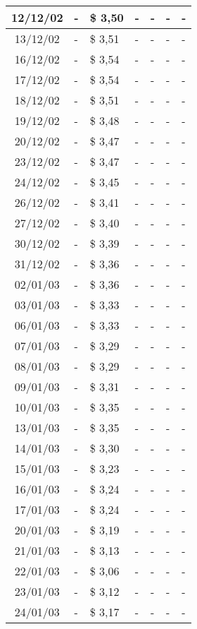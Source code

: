 \begin{center}
\begin{longtable}{|c|p{1.5cm}|p{1.5cm}|p{1.5cm}|p{1.5cm}|p{1.5cm}|p{1.5cm}|}
12/12/02 & - & \$ 3,50 & - & - & - & - \\ \hline
13/12/02 & - & \$ 3,51 & - & - & - & - \\ \hline
16/12/02 & - & \$ 3,54 & - & - & - & - \\ \hline
17/12/02 & - & \$ 3,54 & - & - & - & - \\ \hline
18/12/02 & - & \$ 3,51 & - & - & - & - \\ \hline
19/12/02 & - & \$ 3,48 & - & - & - & - \\ \hline
20/12/02 & - & \$ 3,47 & - & - & - & - \\ \hline
23/12/02 & - & \$ 3,47 & - & - & - & - \\ \hline
24/12/02 & - & \$ 3,45 & - & - & - & - \\ \hline
26/12/02 & - & \$ 3,41 & - & - & - & - \\ \hline
27/12/02 & - & \$ 3,40 & - & - & - & - \\ \hline
30/12/02 & - & \$ 3,39 & - & - & - & - \\ \hline
31/12/02 & - & \$ 3,36 & - & - & - & - \\ \hline
02/01/03 & - & \$ 3,36 & - & - & - & - \\ \hline
03/01/03 & - & \$ 3,33 & - & - & - & - \\ \hline
06/01/03 & - & \$ 3,33 & - & - & - & - \\ \hline
07/01/03 & - & \$ 3,29 & - & - & - & - \\ \hline
08/01/03 & - & \$ 3,29 & - & - & - & - \\ \hline
09/01/03 & - & \$ 3,31 & - & - & - & - \\ \hline
10/01/03 & - & \$ 3,35 & - & - & - & - \\ \hline
13/01/03 & - & \$ 3,35 & - & - & - & - \\ \hline
14/01/03 & - & \$ 3,30 & - & - & - & - \\ \hline
15/01/03 & - & \$ 3,23 & - & - & - & - \\ \hline
16/01/03 & - & \$ 3,24 & - & - & - & - \\ \hline
17/01/03 & - & \$ 3,24 & - & - & - & - \\ \hline
20/01/03 & - & \$ 3,19 & - & - & - & - \\ \hline
21/01/03 & - & \$ 3,13 & - & - & - & - \\ \hline
22/01/03 & - & \$ 3,06 & - & - & - & - \\ \hline
23/01/03 & - & \$ 3,12 & - & - & - & - \\ \hline
24/01/03 & - & \$ 3,17 & - & - & - & - \\ \hline

\end{longtable}
\end{center}
